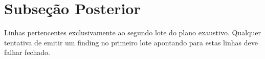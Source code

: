 \section{Subseção Posterior}
Linhas pertencentes exclusivamente ao segundo lote do plano exaustivo.
Qualquer tentativa de emitir um finding no primeiro lote apontando para estas linhas deve falhar fechado.

